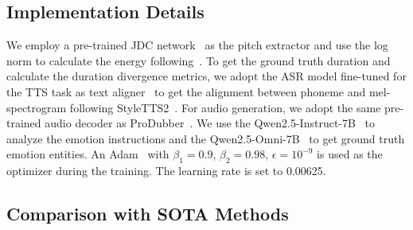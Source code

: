 \subsection{Implementation Details}
We employ a pre-trained JDC network~\cite{JDC} as the pitch extractor and use the log norm to calculate the energy following~\cite{StyleTTS2}.
To get the ground truth duration and calculate the duration divergence metrics, we 
adopt the ASR model fine-tuned for the TTS task as text aligner~\cite{styletts} to get the alignment between phoneme and mel-spectrogram following StyleTTS2~\cite{StyleTTS2}.
For audio generation, we adopt the same pre-trained audio decoder as ProDubber~\cite{ProDubber}.
We use the Qwen2.5-Instruct-7B~\cite{qwen2.5} to analyze the emotion instructions and the Qwen2.5-Omni-7B~\cite{Qwen2.5-Omni} to get ground truth emotion entities.
An Adam~\cite{adam} with $\beta_1=0.9$, $\beta_2=0.98$, $\epsilon=10^{-9}$ is used as the optimizer during the training.
The learning rate is set to 0.00625.




\subsection{Comparison with SOTA Methods}
